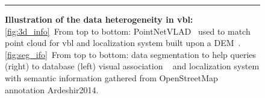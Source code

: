 \begin{figure}[t]
\begin{minipage}{0.48\linewidth}
		\noindent\rule{\linewidth}{0.4pt}		
		
	\end{minipage}
	\caption[Illustration of the data heterogeneity in \ac{vbl}]{\textbf{Illustration of the data heterogeneity in \ac{vbl}:} \ref{fig:3d_info}~From top to bottom: PointNetVLAD~\citep{Uy2018} used to match point cloud for \acs{vbl} and localization system built upon a DEM~\citep{Matei2013}. \ref{fig:seg_ifo}~From top to bottom: data segmentation to help queries (right) to database (left) visual association ~\citep{Schonberger2017a} and localization system with semantic information gathered from OpenStreetMap annotation {Ardeshir2014}. \label{fig:data_div}}
\end{figure}